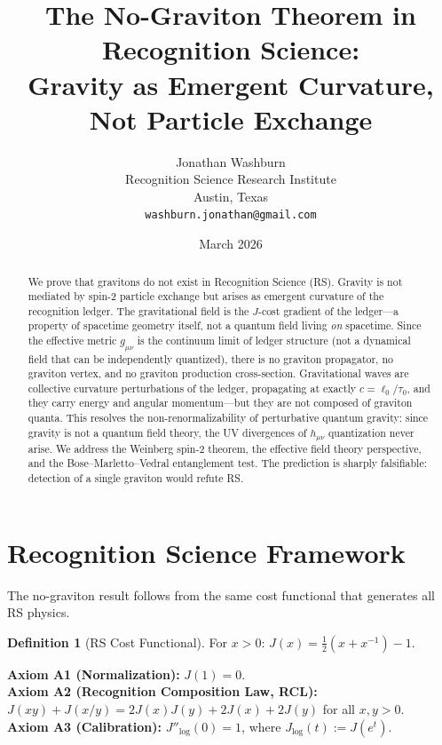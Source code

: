 \documentclass[12pt,a4paper]{article}
\title{The No-Graviton Theorem in Recognition Science:\\
Gravity as Emergent Curvature, Not Particle Exchange}
\author{Jonathan Washburn\\
Recognition Science Research Institute\\
Austin, Texas\\
\texttt{washburn.jonathan@gmail.com}}
\date{March 2026}
\theoremstyle{definition}
\newtheorem{definition}[theorem]{Definition}
\theoremstyle{remark}
\begin{document}
\maketitle

\begin{abstract}
We prove that gravitons do not exist in Recognition Science (RS).
Gravity is not mediated by spin-2 particle exchange but arises as
emergent curvature of the recognition ledger.  The gravitational
field is the $J$-cost gradient of the ledger---a property of
spacetime geometry itself, not a quantum field living \emph{on}
spacetime.  Since the effective metric $g_{\mu\nu}$ is the
continuum limit of ledger structure (not a dynamical field that
can be independently quantized), there is no graviton propagator,
no graviton vertex, and no graviton production cross-section.
Gravitational waves are collective curvature perturbations of the
ledger, propagating at exactly $c = \ell_0/\tau_0$, and they carry
energy and angular momentum---but they are not composed of
graviton quanta.  This resolves the non-renormalizability of
perturbative quantum gravity: since gravity is not a quantum field
theory, the UV divergences of $h_{\mu\nu}$ quantization never
arise.  We address the Weinberg spin-2 theorem, the effective
field theory perspective, and the Bose--Marletto--Vedral
entanglement test.  The prediction is sharply falsifiable:
detection of a single graviton would refute RS.
\end{abstract}

\section{Recognition Science Framework}
\label{sec:framework}

The no-graviton result follows from the same cost functional that
generates all RS physics.

\begin{definition}[RS Cost Functional]
For $x > 0$: $J(x) = \tfrac{1}{2}(x + x^{-1}) - 1$.
\end{definition}

\noindent\textbf{Axiom A1 (Normalization):} $J(1) = 0$.\\
\textbf{Axiom A2 (Recognition Composition Law, RCL):}
$J(xy)+J(x/y)=2J(x)J(y)+2J(x)+2J(y)$ for all $x, y > 0$.\\
\textbf{Axiom A3 (Calibration):} $J''_{\log}(0) = 1$, where
$J_{\log}(t) := J(e^t)$.
\end{document}
